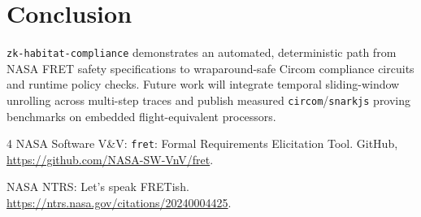 \documentclass[runningheads]{llncs}
\begin{document}
\section{Conclusion}
\texttt{zk-habitat-compliance} demonstrates an automated, deterministic path from NASA FRET safety specifications to wraparound-safe Circom compliance circuits and runtime policy checks. Future work will integrate temporal sliding-window unrolling across multi-step traces and publish measured \texttt{circom}/\texttt{snarkjs} proving benchmarks on embedded flight-equivalent processors.

\begin{thebibliography}{4}
NASA Software V\&V: \texttt{fret}: Formal Requirements Elicitation Tool. GitHub, \url{https://github.com/NASA-SW-VnV/fret}.

NASA NTRS: Let's speak FRETish. \url{https://ntrs.nasa.gov/citations/20240004425}.
\end{thebibliography}
\end{document}

